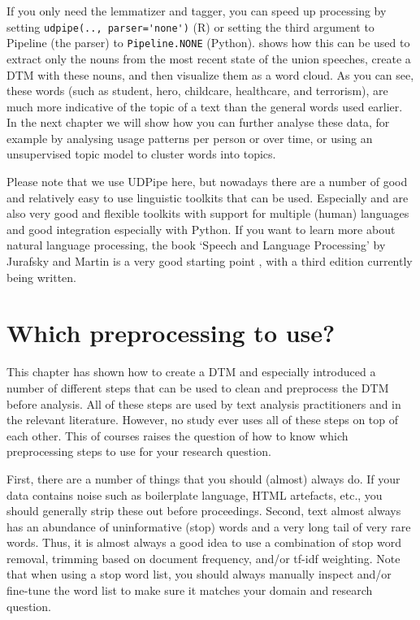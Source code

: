 If you only need the lemmatizer and tagger, you can speed up processing by setting \verb|udpipe(.., parser='none')| (R) or setting the third argument to Pipeline (the parser) to \verb|Pipeline.NONE| (Python).
 shows how this can be used to extract only the nouns from the most recent state of the union speeches,
create a DTM with these nouns, and then visualize them as a word cloud.
As you can see, these words (such as student, hero, childcare, healthcare, and terrorism), are much more indicative of the topic of a text than the general words used earlier.
In the next chapter we will show how you can further analyse these data, for example by analysing usage patterns per person or over time, or using an unsupervised topic model to cluster words into topics.


Please note that we use UDPipe here, but nowadays there are a number of good and relatively easy to use linguistic toolkits that can be used.
Especially  \citep{spacy} and  \citep{stanza} are also very good and flexible toolkits with support for multiple (human) languages and good integration especially with Python.
If you want to learn more about natural language processing, the book `Speech and Language Processing' by Jurafsky and Martin is a very good starting point \citep{jurafsky}, with a third edition currently being written.


\section{Which preprocessing to use?}

This chapter has shown how to create a DTM and especially introduced a number of different steps that can be used to clean and preprocess the DTM before analysis.
All of these steps are used by text analysis practitioners and in the relevant literature.
However, no study ever uses all of these steps on top of each other.
This of courses raises the question of how to know which preprocessing steps to use for your research question.

First, there are a number of things that you should (almost) always do.
If your data contains noise such as boilerplate language, HTML artefacts, etc., you should generally strip these out before proceedings.
Second, text almost always has an abundance of uninformative (stop) words and a very long tail of very rare words.
Thus, it is almost always a good idea to use a combination of stop word removal, trimming based on document frequency, and/or tf-idf weighting.
Note that when using a stop word list, you should always manually inspect and/or fine-tune the word list to make sure it matches your domain and research question.

